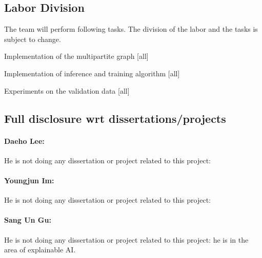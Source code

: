 
\subsection{Labor Division}

The team will perform following tasks. The division of the labor and the tasks is subject to change.
\bit
\item Implementation of the multipartite graph [all]
\item Implementation of inference and training algorithm [all]
\item Experiments on the validation data [all]
\eit

\subsection{Full disclosure wrt dissertations/projects}

\paragraph{Daeho Lee:}
He is not doing any dissertation or project related to this project: 

\paragraph{Youngjun Im:}
He is not doing any dissertation or project related to this project: 

\paragraph{Sang Un Gu:}
He is not doing any dissertation or project related to this project: he is in the area of explainable AI.